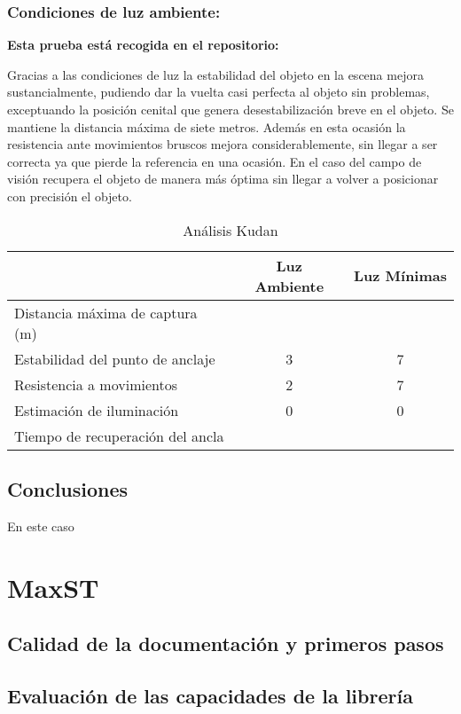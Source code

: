 \subsubsection{Condiciones de luz ambiente:}

\textbf{Esta prueba está recogida en el repositorio:} 

Gracias a las condiciones de luz la estabilidad del objeto en la escena mejora sustancialmente, pudiendo dar la vuelta casi perfecta al objeto sin problemas, exceptuando la posición cenital que genera desestabilización breve en el objeto. Se mantiene la distancia máxima de siete metros. Además en esta ocasión la resistencia ante movimientos bruscos mejora considerablemente, sin llegar a ser correcta ya que pierde la referencia en una ocasión. En el caso del campo de visión recupera el objeto de manera más óptima sin llegar a volver a posicionar con precisión el objeto.

\begin{table}[H]
    \centering
    \begin{tabular}{|l|c|c|}
    \hline
          & Luz Ambiente & Luz Mínimas \\
         \hline
        Distancia máxima de captura (m)  & &\\
        \hline
        Estabilidad del punto de anclaje  &3 &7\\
        \hline
        Resistencia a movimientos  &2 &7 \\
        \hline
        Estimación de iluminación  &0 &0 \\
        \hline
        Tiempo de recuperación del ancla  & & \\
      \hline
    \end{tabular}
  
    \caption{Análisis Kudan}
    \label{tab:TKudan}
\end{table}
\subsection{Conclusiones}
En este caso
\clearpage
\section{MaxST}
\subsection{Calidad de la documentación y primeros pasos}

\subsection{Evaluación de las capacidades de la librería}
